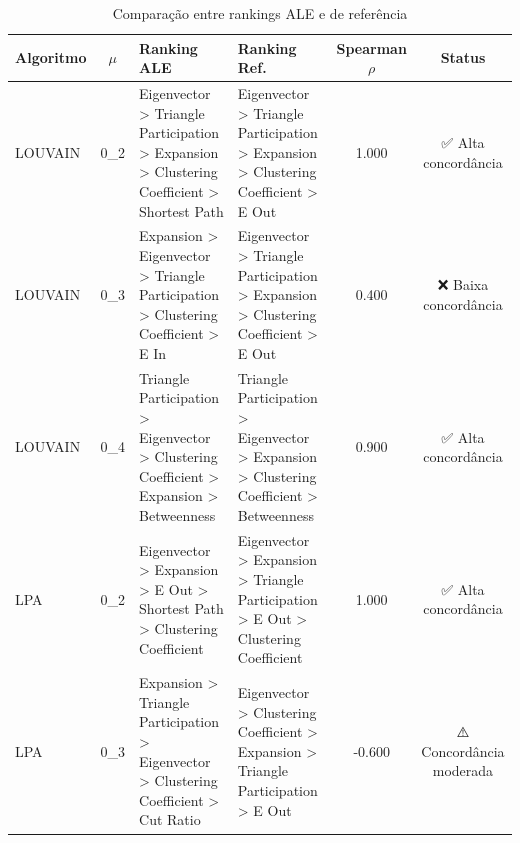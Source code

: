\begin{table}[H]
\centering
\caption{Comparação entre rankings ALE e de referência}
\label{tab:ale_ranking_comparison}
\begin{tabular}{lcllcc}
\hline
\textbf{Algoritmo} & \textbf{$\mu$} & \textbf{Ranking ALE} & \textbf{Ranking Ref.} & \textbf{Spearman $\rho$} & \textbf{Status} \\
\hline
LOUVAIN & 0_2 & Eigenvector > Triangle Participation > Expansion > Clustering Coefficient > Shortest Path & Eigenvector > Triangle Participation > Expansion > Clustering Coefficient > E Out & 1.000 & ✅ Alta concordância \\
LOUVAIN & 0_3 & Expansion > Eigenvector > Triangle Participation > Clustering Coefficient > E In & Eigenvector > Triangle Participation > Expansion > Clustering Coefficient > E Out & 0.400 & ❌ Baixa concordância \\
LOUVAIN & 0_4 & Triangle Participation > Eigenvector > Clustering Coefficient > Expansion > Betweenness & Triangle Participation > Eigenvector > Expansion > Clustering Coefficient > Betweenness & 0.900 & ✅ Alta concordância \\
LPA & 0_2 & Eigenvector > Expansion > E Out > Shortest Path > Clustering Coefficient & Eigenvector > Expansion > Triangle Participation > E Out > Clustering Coefficient & 1.000 & ✅ Alta concordância \\
LPA & 0_3 & Expansion > Triangle Participation > Eigenvector > Clustering Coefficient > Cut Ratio & Eigenvector > Clustering Coefficient > Expansion > Triangle Participation > E Out & -0.600 & ⚠️ Concordância moderada \\
\hline
\end{tabular}
\end{table}